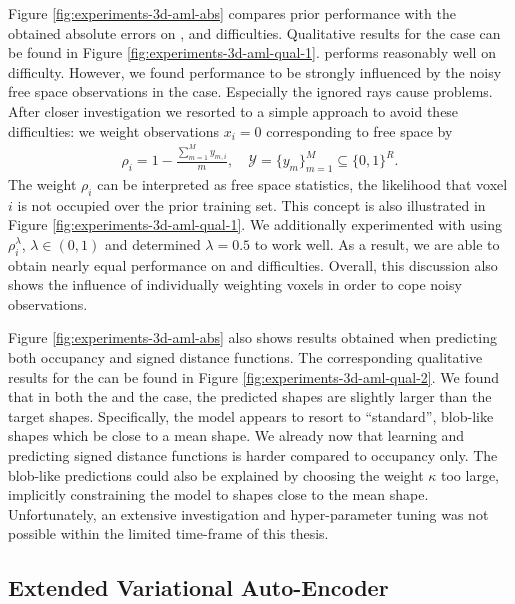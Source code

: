 Figure \ref{fig:experiments-3d-aml-abs} compares prior performance with
the obtained absolute errors on \easy, \moderate and \hard difficulties.
Qualitative results for the \moderate case can be found
in Figure \ref{fig:experiments-3d-aml-qual-1}. \AML performs reasonably well
on \moderate difficulty. However, we found performance to be strongly
influenced by the noisy free space observations in the \hard case. Especially
the ignored rays cause problems. After closer investigation we
resorted to a simple approach to avoid these difficulties: we weight observations
$x_i = 0$ corresponding to free space by
\begin{align}
  \rho_i = 1 - \frac{\sum_{m = 1}^M y_{m,i}}{m},\quad \mathcal{Y} = \{y_m\}_{m = 1}^M \subseteq \{0,1\}^R.
  \label{eq:experiments-3d-weights}
\end{align}
The weight $\rho_i$ can be interpreted as free space statistics, \ie the likelihood that
voxel $i$ is not occupied over the prior training set. This concept is also illustrated
in Figure \ref{fig:experiments-3d-aml-qual-1}. We additionally experimented with using
$\rho_i^\lambda$, $\lambda \in (0,1)$ and determined $\lambda = 0.5$ to work well.
As a result, we are able to obtain nearly equal performance on \moderate
and \hard difficulties. Overall, this discussion also shows
the influence of individually weighting voxels in order to cope noisy observations.
    
Figure \ref{fig:experiments-3d-aml-abs} also shows results obtained
when predicting both occupancy and signed distance functions. The corresponding
qualitative results for the \hard can be found in Figure
\ref{fig:experiments-3d-aml-qual-2}. We found that in both the \moderate and
the \hard case, the predicted shapes are slightly larger than the target
shapes. Specifically, the model appears to resort to
``standard'', blob-like shapes which be close to a mean shape.
We already now that learning and predicting signed distance
functions is harder compared to occupancy only. The blob-like predictions
could also be explained by choosing the weight $\kappa$ too large, implicitly
constraining the model to shapes close to the mean shape. 
Unfortunately, an extensive investigation and hyper-parameter tuning was not
possible within the limited time-frame of this thesis.

\subsection{Extended Variational Auto-Encoder}

